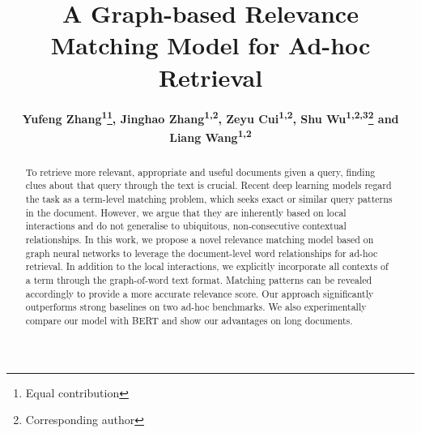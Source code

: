 \documentclass[letterpaper]{article} %
\title{A Graph-based Relevance Matching Model for Ad-hoc Retrieval}
\author{\textbf{Yufeng Zhang\textsuperscript{\rm 1}\thanks{Equal contribution}, Jinghao Zhang\textsuperscript{\rm 1,\rm 2}\footnotemark[1], Zeyu Cui\textsuperscript{\rm 1,\rm 2}, Shu Wu\textsuperscript{\rm 1,\rm2,\rm 3}\thanks{Corresponding author} and Liang Wang\textsuperscript{\rm 1,\rm 2}} \\
}
\begin{document}
\maketitle

\begin{abstract}
To retrieve more relevant, appropriate and useful documents given a query, finding clues about that query through the text is crucial. Recent deep learning models regard the task as a term-level matching problem, which seeks exact or similar query patterns in the document. However, we argue that they are inherently based on local interactions and do not generalise to ubiquitous, non-consecutive contextual relationships. In this work, we propose a novel relevance matching model based on graph neural networks to leverage the document-level word relationships for ad-hoc retrieval. In addition to the local interactions, we explicitly incorporate all contexts of a term through the graph-of-word text format. Matching patterns can be revealed accordingly to provide a more accurate relevance score. Our approach significantly outperforms strong baselines on two ad-hoc benchmarks. We also experimentally compare our model with BERT and show our advantages on long documents.



\end{abstract}














\end{document}
